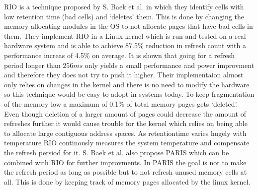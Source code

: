 RIO is a technique proposed by S. Baek et al. \cite{rioparis} in which they identify cells with low retention time (bad cells) and `deletes' them. This is done by changing the memory allocating modules in the OS to not allocate pages that have bad cells in them. They implement RIO in a Linux kernel which is run and tested on a real hardware system and is able to achieve 87.5\% reduction in refresh count with a performance increas of 4.5\% on average. It is shown that going for a refresh period longer than \(256ms\) only yields a small performance and power improvment and therefore they does not try to push it higher. Their implementaion almost only relies on changes in the kernel and there is no need to modify the hardware so this technique would be easy to adopt in systems today. To keep fragmentation of the memory low a maximum of 0.1\% of total memory pages gets `deleted'. Even though deletion of a larger amount of pages could decrease the amount of refreshes further it would cause trouble for the kernel which relies on being able to allocate large contiguous address spaces. As retentiontime varies hugely with temperature RIO continously measures the system temperature and compensate the refresh persiod for it. S. Baek et al. also propose PARIS which can be combined with RIO for further improvments. In PARIS the goal is not to make the refresh period as long as possible but to not refresh unused memory cells at all. This is done by keeping track of memory pages allocated by the linux kernel.